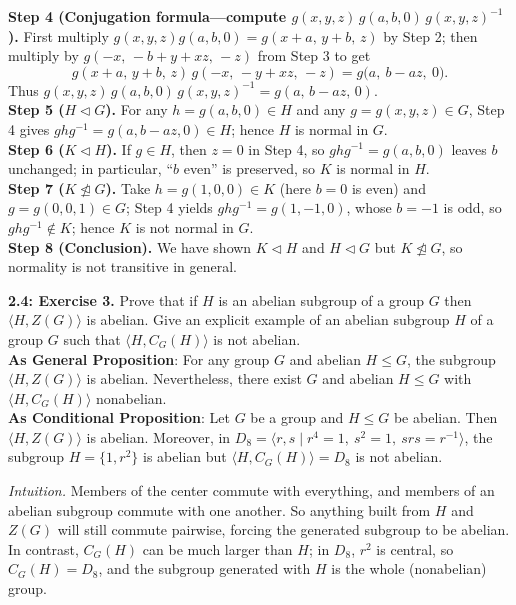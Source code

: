 \documentclass[12pt]{article}
\theoremstyle{definition}
\begin{document}
\textbf{Step 4 (Conjugation formula—compute $g(x,y,z)\,g(a,b,0)\,g(x,y,z)^{-1}$).} First multiply $g(x,y,z)g(a,b,0)=g(x+a,\,y+b,\,z)$ by Step 2; then multiply by $g(-x,\,-b+y+xz,\,-z)$ from Step 3 to get
\[
g(x+a,\,y+b,\,z)\,g(-x,\,-y+xz,\,-z)=g\big(a,\ b-az,\ 0\big).
\]
Thus $g(x,y,z)\,g(a,b,0)\,g(x,y,z)^{-1}=g(a,\,b-az,\,0)$.\\
\textbf{Step 5 ($H\lhd G$).} For any $h=g(a,b,0)\in H$ and any $g=g(x,y,z)\in G$, Step 4 gives $ghg^{-1}=g(a,b-az,0)\in H$; hence $H$ is normal in $G$.\\
\textbf{Step 6 ($K\lhd H$).} If $g\in H$, then $z=0$ in Step 4, so $ghg^{-1}=g(a,b,0)$ leaves $b$ unchanged; in particular, “$b$ even” is preserved, so $K$ is normal in $H$.\\
\textbf{Step 7 ($K\ntrianglelefteq G$).} Take $h=g(1,0,0)\in K$ (here $b=0$ is even) and $g=g(0,0,1)\in G$; Step 4 yields $ghg^{-1}=g(1,-1,0)$, whose $b=-1$ is odd, so $ghg^{-1}\notin K$; hence $K$ is not normal in $G$.\\
\textbf{Step 8 (Conclusion).} We have shown $K\lhd H$ and $H\lhd G$ but $K\ntrianglelefteq G$, so normality is not transitive in general.\\

\newpage

\noindent \textbf{2.4: Exercise 3.} Prove that if $H$ is an abelian subgroup of a group $G$ then $\langle H, Z(G)\rangle$ is abelian. Give an explicit example of an abelian subgroup $H$ of a group $G$ such that $\langle H, C_G(H)\rangle$ is not abelian.\\ %

\noindent\textbf{As General Proposition}: For any group $G$ and abelian $H\le G$, the subgroup $\langle H, Z(G)\rangle$ is abelian. Nevertheless, there exist $G$ and abelian $H\le G$ with $\langle H, C_G(H)\rangle$ nonabelian.\\

\noindent \textbf{As Conditional Proposition}: Let $G$ be a group and $H\le G$ be abelian. Then $\langle H, Z(G)\rangle$ is abelian. Moreover, in $D_8=\langle r,s\mid r^4=1,\ s^2=1,\ srs=r^{-1}\rangle$, the subgroup $H=\{1,r^2\}$ is abelian but $\langle H, C_G(H)\rangle=D_8$ is not abelian.

\newpage

\dotfill

\emph{Intuition.} Members of the center commute with everything, and members of an abelian subgroup commute with one another. So anything built from $H$ and $Z(G)$ will still commute pairwise, forcing the generated subgroup to be abelian. In contrast, $C_G(H)$ can be much larger than $H$; in $D_8$, $r^2$ is central, so $C_G(H)=D_8$, and the subgroup generated with $H$ is the whole (nonabelian) group.\\
\end{document}
